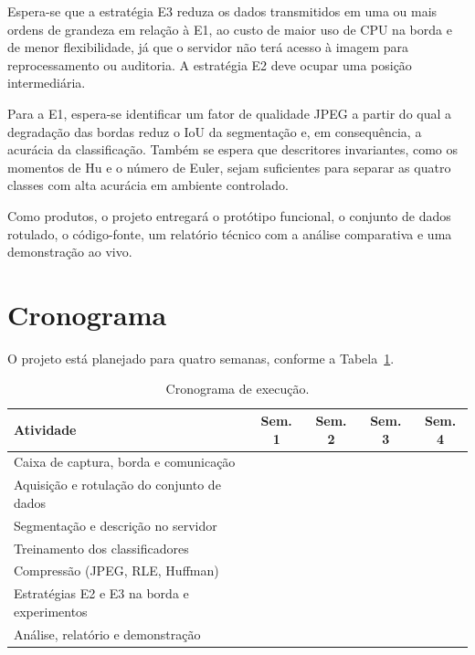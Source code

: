 \documentclass[12pt]{article}
\begin{document}
Espera-se que a estratégia E3 reduza os dados transmitidos em uma ou mais ordens de grandeza em relação à E1, ao custo de maior uso de CPU na borda e de menor flexibilidade, já que o servidor não terá acesso à imagem para reprocessamento ou auditoria. A estratégia E2 deve ocupar uma posição intermediária.

Para a E1, espera-se identificar um fator de qualidade JPEG a partir do qual a degradação das bordas reduz o IoU da segmentação e, em consequência, a acurácia da classificação. Também se espera que descritores invariantes, como os momentos de Hu e o número de Euler, sejam suficientes para separar as quatro classes com alta acurácia em ambiente controlado.

Como produtos, o projeto entregará o protótipo funcional, o conjunto de dados rotulado, o código-fonte, um relatório técnico com a análise comparativa e uma demonstração ao vivo.

\section{Cronograma}
\label{sec:cronograma}

O projeto está planejado para quatro semanas, conforme a Tabela~\ref{tab:cronograma}.

\begin{table}[H]
  \centering
  \caption{Cronograma de execução.}
  \label{tab:cronograma}
  \newcommand{\on}{\cellcolor{bordaesc}}
  \begin{tabular}{lcccc}
    \toprule
    \textbf{Atividade} & \textbf{Sem. 1} & \textbf{Sem. 2} & \textbf{Sem. 3} & \textbf{Sem. 4} \\
    \midrule
    Caixa de captura, borda e comunicação & \on & & & \\
    Aquisição e rotulação do conjunto de dados & \on & & & \\
    Segmentação e descrição no servidor & & \on & & \\
    Treinamento dos classificadores & & \on & & \\
    Compressão (JPEG, RLE, Huffman) & & & \on & \\
    Estratégias E2 e E3 na borda e experimentos & & & \on & \\
    Análise, relatório e demonstração & & & & \on \\
    \bottomrule
  \end{tabular}
\end{table}
\end{document}
